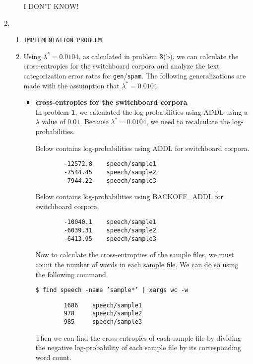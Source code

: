 \documentclass[11pt]{article}
\newcommand{\codebox}[1]{\colorbox{codegray}{\texttt{#1}}}
\begin{document}
\begin{enumerate}
\begin{enumerate}[label=(\alph*)]
		I DON'T KNOW!
	\end{enumerate}
\item %
	\begin{enumerate}[label=(\alph*)]
	\item %
		\texttt{IMPLEMENTATION PROBLEM}
	\item %
		Using $\lambda^* = 0.0104$, as calculated in problem \textbf{3}(b), we can calculate the cross-entropies for the switchboard corpora and analyze the text categorization error rates for \texttt{gen}/\texttt{spam}. The following generalizations are made with the assumption that $\lambda^* = 0.0104$.
		\begin{itemize}
			\item[] \hspace{-24pt} 
				\textbf{cross-entropies for the switchboard corpora} \vspace{4pt} \\
				In problem \textbf{1}, we calculated the log-probabilities using ADDL using a $\lambda$ value of $0.01$. Because $\lambda^* = 0.0104$, we need to recalculate the log-probabilities. \vspace{4pt}

				Below contains log-probabilities using ADDL for switchboard corpora.
				\begin{lstlisting}
		-12572.8    speech/sample1
		-7544.45    speech/sample2
		-7944.22    speech/sample3
				\end{lstlisting}

				Below contains log-probabilities using BACKOFF\_ADDL for switchboard corpora.
				\begin{lstlisting}
		-10040.1    speech/sample1
		-6039.31    speech/sample2
		-6413.95    speech/sample3
				\end{lstlisting}
				
				Now to calculate the cross-entropties of the sample files, we must count the number of words in each sample file. We can do so using the following command. \vspace{4pt}

				\codebox{\$ find speech -name 'sample*' | xargs wc -w \hspace{49mm}}
				\begin{lstlisting}
		1686    speech/sample1
		978     speech/sample2
		985     speech/sample3
				\end{lstlisting}

				Then we can find the cross-entropies of each sample file by dividing the negative log-probability of each sample file by its corresponding word count. \\
				

\end{itemize}
\end{enumerate}
\end{enumerate}
\end{document}
